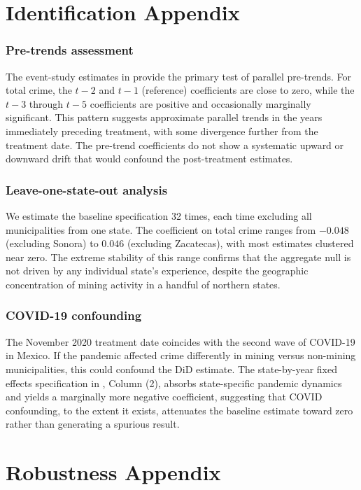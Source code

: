 \documentclass[12pt]{article}
\begin{document}
\section{Identification Appendix}
\label{sec:id_appendix}

\subsubsection*{Pre-trends assessment} The event-study estimates in  provide the primary test of parallel pre-trends. For total crime, the $t-2$ and $t-1$ (reference) coefficients are close to zero, while the $t-3$ through $t-5$ coefficients are positive and occasionally marginally significant. This pattern suggests approximate parallel trends in the years immediately preceding treatment, with some divergence further from the treatment date. The pre-trend coefficients do not show a systematic upward or downward drift that would confound the post-treatment estimates.

\subsubsection*{Leave-one-state-out analysis} We estimate the baseline specification 32 times, each time excluding all municipalities from one state. The coefficient on total crime ranges from $-0.048$ (excluding Sonora) to $0.046$ (excluding Zacatecas), with most estimates clustered near zero. The extreme stability of this range confirms that the aggregate null is not driven by any individual state's experience, despite the geographic concentration of mining activity in a handful of northern states.

\subsubsection*{COVID-19 confounding} The November 2020 treatment date coincides with the second wave of COVID-19 in Mexico. If the pandemic affected crime differently in mining versus non-mining municipalities, this could confound the DiD estimate. The state-by-year fixed effects specification in , Column (2), absorbs state-specific pandemic dynamics and yields a marginally more negative coefficient, suggesting that COVID confounding, to the extent it exists, attenuates the baseline estimate toward zero rather than generating a spurious result.


\section{Robustness Appendix}
\label{sec:robustness_appendix}
\end{document}
